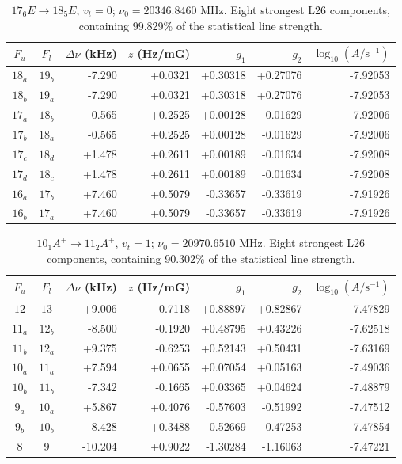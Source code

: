 \begin{table}[!htbp]
\centering\small\renewcommand{\arraystretch}{1.1}\setlength{\tabcolsep}{5pt}
\caption{$17_{6} E\rightarrow 18_{5} E$, $v_t=0$; $\nu_0=20346.8460$ MHz. Eight strongest L26 components, containing 99.829\% of the statistical line strength.}
\label{tab:sm-zeeman-20p3}
\begin{tabular}{ccrrrrr}
\hline\hline
$F_u$ & $F_l$ & $\Delta\nu$ (kHz) & $z$ (Hz/mG) & $g_1$ & $g_2$ & $\log_{10}(A/\mathrm{s}^{-1})$ \\
\hline
$18_{a}$ & $19_{b}$ & -7.290 & +0.0321 & +0.30318 & +0.27076 & -7.92053\\
$18_{b}$ & $19_{a}$ & -7.290 & +0.0321 & +0.30318 & +0.27076 & -7.92053\\
$17_{a}$ & $18_{b}$ & -0.565 & +0.2525 & +0.00128 & -0.01629 & -7.92006\\
$17_{b}$ & $18_{a}$ & -0.565 & +0.2525 & +0.00128 & -0.01629 & -7.92006\\
$17_{c}$ & $18_{d}$ & +1.478 & +0.2611 & +0.00189 & -0.01634 & -7.92008\\
$17_{d}$ & $18_{c}$ & +1.478 & +0.2611 & +0.00189 & -0.01634 & -7.92008\\
$16_{a}$ & $17_{b}$ & +7.460 & +0.5079 & -0.33657 & -0.33619 & -7.91926\\
$16_{b}$ & $17_{a}$ & +7.460 & +0.5079 & -0.33657 & -0.33619 & -7.91926\\
\hline\end{tabular}
\end{table}

\begin{table}[!htbp]
\centering\small\renewcommand{\arraystretch}{1.1}\setlength{\tabcolsep}{5pt}
\caption{$10_{1} A^{+}\rightarrow 11_{2} A^{+}$, $v_t=1$; $\nu_0=20970.6510$ MHz. Eight strongest L26 components, containing 90.302\% of the statistical line strength.}
\label{tab:sm-zeeman-20p9}
\begin{tabular}{ccrrrrr}
\hline\hline
$F_u$ & $F_l$ & $\Delta\nu$ (kHz) & $z$ (Hz/mG) & $g_1$ & $g_2$ & $\log_{10}(A/\mathrm{s}^{-1})$ \\
\hline
$12$ & $13$ & +9.006 & -0.7118 & +0.88897 & +0.82867 & -7.47829\\
$11_{a}$ & $12_{b}$ & -8.500 & -0.1920 & +0.48795 & +0.43226 & -7.62518\\
$11_{b}$ & $12_{a}$ & +9.375 & -0.6253 & +0.52143 & +0.50431 & -7.63169\\
$10_{a}$ & $11_{a}$ & +7.594 & +0.0655 & +0.07054 & +0.05163 & -7.49036\\
$10_{b}$ & $11_{b}$ & -7.342 & -0.1665 & +0.03365 & +0.04624 & -7.48879\\
$9_{a}$ & $10_{a}$ & +5.867 & +0.4076 & -0.57603 & -0.51992 & -7.47512\\
$9_{b}$ & $10_{b}$ & -8.428 & +0.3488 & -0.52669 & -0.47253 & -7.47854\\
$8$ & $9$ & -10.204 & +0.9022 & -1.30284 & -1.16063 & -7.47221\\
\hline\end{tabular}
\end{table}

